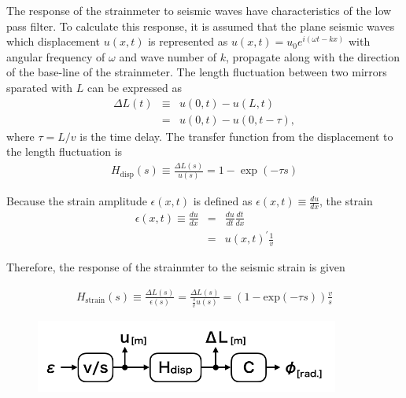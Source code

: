 The response of the strainmeter to seismic waves have characteristics of the low pass filter. To calculate this response, it is assumed that the plane seismic waves which displacement $u(x,t)$ is represented as $u(x,t)=u_0e^{i(\omega{t}-kx)}$ with angular frequency of $\omega$ and wave number of $k$, propagate along with the direction of the base-line of the strainmeter. The length fluctuation between two mirrors sparated with $L$ can be expressed as 
\begin{eqnarray}
  \Delta{L(t)} &\equiv& u(0,t) - u(L,t) \\
  &=& u(0,t) - u(0,t-\tau), \label{eq:chap4_10}
\end{eqnarray}
where $\tau=L/v$ is the time delay. 
The transfer function from the displacement to the length fluctuation is
\begin{eqnarray}
  H_{\mathrm{disp}}(s) \equiv \frac{\Delta{L(s)}}{u(s)} = 1 - \exp(-\tau{s})
\end{eqnarray}

Because the strain amplitude $\epsilon(x,t)$ is defined as $\epsilon(x,t)\equiv\frac{du}{dx}$, the strain
\begin{eqnarray}
  \epsilon(x,t) \equiv \frac{du}{dx} &=& \frac{du}{dt} \frac{dt}{dx}\\
  &=& {u(x,t)}^{\prime}\frac{1}{v}
\end{eqnarray}


Therefore, the response of the strainmter to the seismic strain is given

\begin{eqnarray}
  H_{\mathrm{strain}}(s) \equiv \frac{\Delta{L(s)}}{\epsilon(s)} = \frac{\Delta{L(s)}}{\frac{s}{v}u(s)} = \left(1 - \mathrm{exp}(-\tau{s})\right) \frac{v}{s}
\end{eqnarray}



\begin{figure}[h]
  \begin{center}
    \includegraphics[width=10.0cm]{./img_chap4/img411.png}
    \caption{}
  \end{center}
\end{figure}



